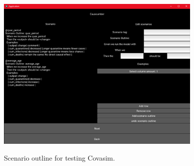 \begin{figure}[H]
	\centering
	\includegraphics[width=10cm]{figures/CovasimTestProcess5.png}\\
	\caption{Scenario outline for testing Covasim.}
	\label{fig:figure38}
\end{figure}

